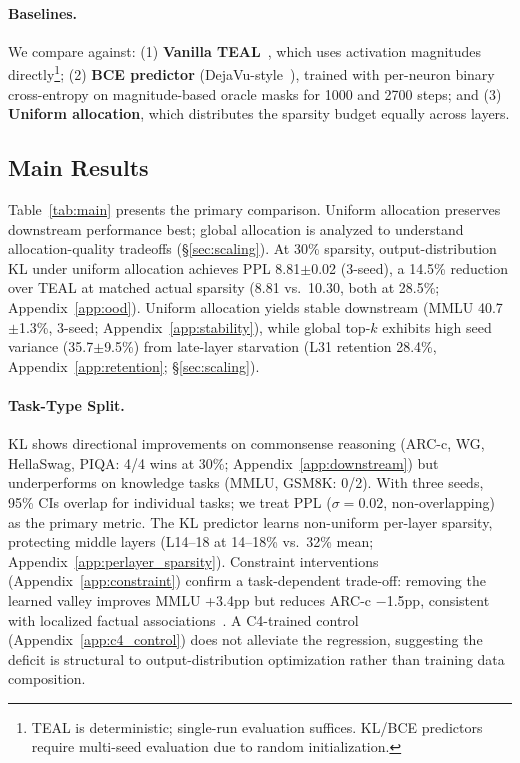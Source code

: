 \paragraph{Baselines.}
We compare against: (1) \textbf{Vanilla TEAL}~\cite{liu2025teal}, which uses activation magnitudes directly\footnote{TEAL is deterministic; single-run evaluation suffices. KL/BCE predictors require multi-seed evaluation due to random initialization.}; (2) \textbf{BCE predictor} (DejaVu-style~\cite{liu2023dejavu}), trained with per-neuron binary cross-entropy on magnitude-based oracle masks for 1000 and 2700 steps; and (3) \textbf{Uniform allocation}, which distributes the sparsity budget equally across layers.


\subsection{Main Results}

Table~\ref{tab:main} presents the primary comparison. Uniform allocation preserves downstream performance best; global allocation is analyzed to understand allocation-quality tradeoffs (\S\ref{sec:scaling}).
At 30\% sparsity, output-distribution KL under uniform allocation achieves PPL 8.81$\pm$0.02 (3-seed), a 14.5\% reduction over TEAL at matched actual sparsity (8.81 vs.\ 10.30, both at 28.5\%; Appendix~\ref{app:ood}).
Uniform allocation yields stable downstream (MMLU 40.7$\pm$1.3\%, 3-seed; Appendix~\ref{app:stability}), while global top-$k$ exhibits high seed variance (35.7$\pm$9.5\%) from late-layer starvation (L31 retention 28.4\%, Appendix~\ref{app:retention}; \S\ref{sec:scaling}).

\paragraph{Task-Type Split.}
KL shows directional improvements on commonsense reasoning (ARC-c, WG, HellaSwag, PIQA: 4/4 wins at 30\%; Appendix~\ref{app:downstream}) but underperforms on knowledge tasks (MMLU, GSM8K: 0/2).
With three seeds, 95\% CIs overlap for individual tasks; we treat PPL ($\sigma{=}0.02$, non-overlapping) as the primary metric.
The KL predictor learns non-uniform per-layer sparsity, protecting middle layers (L14--18 at 14--18\% vs.\ 32\% mean; Appendix~\ref{app:perlayer_sparsity}).
Constraint interventions (Appendix~\ref{app:constraint}) confirm a task-dependent trade-off: removing the learned valley improves MMLU +3.4pp but reduces ARC-c $-$1.5pp, consistent with localized factual associations~\cite{geva2023dissecting}. A C4-trained control (Appendix~\ref{app:c4_control}) does not alleviate the regression, suggesting the deficit is structural to output-distribution optimization rather than training data composition.

